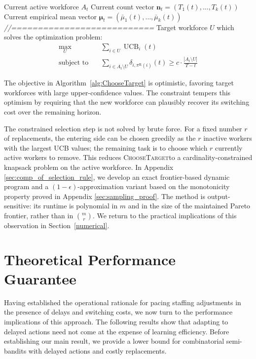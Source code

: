 \documentclass[opre,blindrev]{informs3}
\newcommand{\UCB}{\operatorname{UCB}}
\newcommand{\ChooseTarget}{\textsc{ChooseTarget}}
\begin{document}
\begin{algorithm}
    \caption{ChooseTarget}
    \label{alg:ChooseTarget}
    \begin{algorithmic}[1]
        \Require Current active workforce \(A_t\)
        \Require Current count vector \(\mathbf{n}_t=(T_1(t),\dots,T_k(t))\)
        \Require Current empirical mean vector \(\boldsymbol{\mu}_t=(\bar{\mu}_1(t),\dots,\bar{\mu}_k(t))\)
        \Statex \textit{//===========================}
        \State \Return Target workforce \(U\) which solves the optimization problem:
        \begin{align}\label{eq:opt}
            \max_{U} \quad & \sum_{i\in U}\UCB_i(t)\\
            \text{subject to}\quad &\sum_{i\in A_t\setminus U}\delta_{i,\pi^\mathrm{R}(i)}(t)\geq c\cdot \frac{| A_t\setminus U|}{T-t}
        \end{align}
    \end{algorithmic}
\end{algorithm}
The objective in Algorithm~\ref{alg:ChooseTarget} is optimistic, favoring target workforces with large upper-confidence values. The constraint tempers this optimism by requiring that the new workforce can plausibly recover its switching cost over the remaining horizon.

\begin{remark}
    The constrained selection step is not solved by brute force. For a fixed number \(r\) of replacements, the entering side can be chosen greedily as the \(r\) inactive workers with the largest UCB values; the remaining task is to choose which \(r\) currently active workers to remove. This reduces \ChooseTarget to a cardinality-constrained knapsack problem on the active workforce. In Appendix \ref{sec:comp_of_selection_rule}, we develop an exact frontier-based dynamic program and a \((1-\epsilon)\)-approximation variant based on the monotonicity property proved in Appendix \ref{sec:sampling_proof}. The method is output-sensitive: its runtime is polynomial in \(m\) and in the size of the maintained Pareto frontier, rather than in \(\binom{m}{r}\). We return to the practical implications of this observation in Section~\ref{numerical}.
\end{remark}

\section{Theoretical Performance Guarantee}
\label{theoretical}
Having established the operational rationale for pacing staffing adjustments in the presence of delays and switching costs, we now turn to the performance implications of this approach. The following results show that adapting to delayed actions need not come at the expense of learning efficiency. Before establishing our main result, we provide a lower bound for combinatorial semi-bandits with delayed actions and costly replacements.
\end{document}
